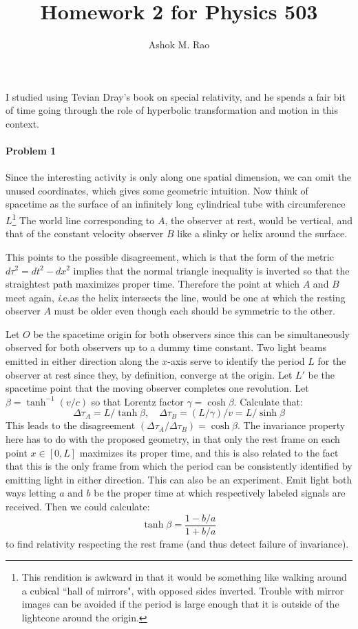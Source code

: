 \documentclass[10pt]{scrartcl}
\title{Homework 2 for Physics  503}
\author{Ashok M. Rao}
\newcommand{\ie}{{\textit i.e.}}
\begin{document}
\maketitle
{}
I studied using Tevian Dray's book on special relativity, and he spends a fair bit of time going through the role of hyperbolic transformation and motion in this context.
\paragraph{Problem 1}
Since the interesting activity is only along one spatial dimension, we can omit the unused coordinates, which gives some geometric intuition. Now think of spacetime as the surface of an infinitely long cylindrical tube with circumference $L$\footnote{This rendition is awkward in that it would be something like walking around a cubical ``hall of mirrors", with opposed sides inverted. Trouble with mirror images can be avoided if the period is large enough that it is outside of the lightcone around the origin.} The world line corresponding to $A$, the observer at rest, would be vertical, and that of the constant velocity observer $B$ like a slinky or helix around the surface.   

This points to the possible disagreement, which is that the form of the metric $d\tau^2 = dt^2 - dx^2$ implies that the normal triangle inequality is inverted so that the straightest path maximizes proper time. Therefore the point at which $A$ and $B$ meet again, \ie as the helix intersects the line, would be one at which the resting observer $A$ must be older even though each should be symmetric to the other.  

Let $O$ be the spacetime origin for both observers since this can be simultaneously observed for both observers up to a dummy time constant.  Two light beams emitted in either direction along the $x$-axis serve to identify the period $L$ for the observer at rest since they, by definition, converge at the origin. Let $L'$ be the spacetime point that the moving observer completes one revolution. Let $\beta=\tanh^{-1}{(v/c)}$ so that Lorentz factor $\gamma = \cosh{\beta}$.  Calculate that:
\[
	\Delta\tau_{A} =L/\tanh{\beta},\quad\Delta\tau_{B} =(L/\gamma)/v= L/\sinh{\beta}
\]
This leads to the disagreement $(\Delta\tau_A /\Delta\tau_B) = \cosh{\beta}$. The invariance property here has to do with the proposed geometry, in that only the rest frame on each point $x\in[0, L]$ maximizes its proper time, and this is also related to the fact that this is the only frame from which the period can be consistently identified by emitting light in either direction. This can also be an experiment. Emit light both ways letting $a$ and $b$ be the proper time at which respectively labeled signals are received. Then we could calculate:
\[
\tanh{\beta} = \frac{1 - {b}/{a}}{1 + {b}/{a}}
\]
to find relativity respecting the rest frame (and thus detect failure of invariance).
\end{document}

